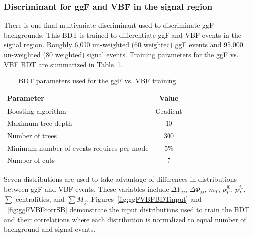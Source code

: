 \subsubsection{Discriminant for ggF and VBF in the signal region}
There is one final multivariate discriminant used to discriminate ggF backgrounds. This BDT is trained to differentiate ggF and VBF events in the signal region. Roughly 6,000 un-weighted (60 weighted) ggF events and 95,000 un-weighted (80 weighted) signal events. Training parameters for the ggF vs. VBF BDT are summarized in Table~\ref{tab:ggFVBFBDTparameters}.
\begin{table}[h!]
\centering
\begin{tabular}{|l|c|c|}
\hline
Parameter                                    & Value     \\
\hline
Boosting algorithm                           & Gradient \\
Maximum tree depth                           &  10      \\
Number of trees                              &  300    \\
Minimum number of events requires per mode   &  5\%     \\
Number of cuts                               &  7       \\
\hline
\end{tabular}
\caption{BDT parameters used for the ggF vs. VBF training.}
\label{tab:ggFVBFBDTparameters}
\end{table}

Seven distributions are used to take advantage of differences in distributions between ggF and VBF events. These variables include $\Delta Y_{jj}$, $\Delta \Phi_{jj}$, $m_T$, $p_T^{j0}$, $p_T^{j1}$, $\sum$ centralities, and $\sum M_{lj}$. Figures~\ref{fig:ggFVBFBDTinput} and ~\ref{fig:ggFVBFcorrSB} demonstrate the input distributions used to train the BDT and their correlations where each distribution is normalized to equal number of background and signal events.

